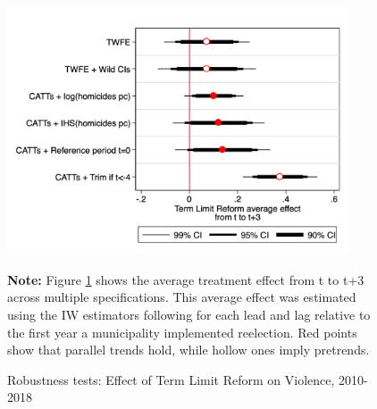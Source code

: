\documentclass[12pt]{amsart}
\numberwithin{equation}{section}
\theoremstyle{definition}
\theoremstyle{definition}
\theoremstyle{definition}
\begin{document}
     \begin{figure}[H]   
\centering
 \caption{Robustness tests: Effect of Term Limit Reform on Violence, 2010-2018}
 \label{fig:robustness_violence}
\includegraphics[width=0.9\textwidth]{../Figures/average_effects_homicides.png}
       \captionsetup{justification=centering}
       
 \textbf{Note:} Figure \ref{fig:robustness_violence} shows the average treatment effect from t to t+3 across multiple specifications. This average effect was estimated using the IW estimators following \citet{abraham_sun_2020} for each lead and lag relative to the first year a municipality implemented reelection. Red points show that parallel trends hold, while hollow ones imply pretrends. 
\end{figure}   
\end{document}
